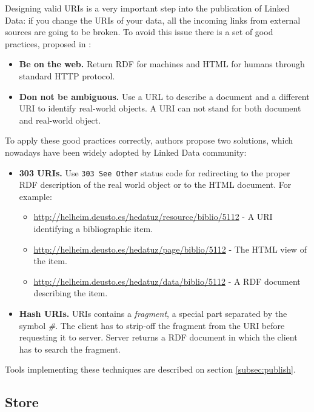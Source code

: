 Designing valid URIs is a very important step into the publication of Linked Data: if you change the URIs of your data, all the incoming links from external sources are going to be broken. To avoid this issue there is a set of good practices, proposed in \cite{ayers2008cool}:

\begin{itemize}
    \item \textbf{Be on the web.} Return RDF for machines and HTML for humans through standard HTTP protocol.
    \item \textbf{Don not be ambiguous.} Use a URL to describe a document and a different URI to identify real-world objects. A URI can not stand for both document and real-world object.
\end{itemize}

To apply these good practices correctly, authors propose two solutions, which nowadays have been widely adopted by Linked Data community:

\begin{itemize}
    \item \textbf{303 URIs.} Use \texttt{303 See Other} status code for redirecting to the proper RDF description of the real world object or to the HTML document. For example:
    \begin{itemize}
        \item \url{http://helheim.deusto.es/hedatuz/resource/biblio/5112} - A URI identifying a bibliographic item.
        \item \url{http://helheim.deusto.es/hedatuz/page/biblio/5112} - The HTML view of the item.
        \item \url{http://helheim.deusto.es/hedatuz/data/biblio/5112} - A RDF document describing the item.
    \end{itemize}

    \item \textbf{Hash URIs.} URIs contains a \textit{fragment}, a special part separated by the symbol \textit{\#}. The client has to strip-off the fragment from the URI before requesting it to server. Server returns a RDF document in which the client has to search the fragment.
\end{itemize}

Tools implementing these techniques are described on section \ref{subsec:publish}.


\subsection{Store}\label{subsec:store}


